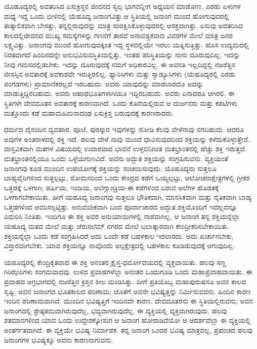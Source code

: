 ಯೊಹೂದ್ಯರಲ್ಲಿ ಅವತರಿಸಿದ ಏಸುಕ್ರಿಸ್ತನ ಜೀವನದ ಸ್ವಲ್ಪ ಭಾಗವನ್ನೀಗ ಅಧ್ಯಯನ ಮಾಡೋಣ. ಎರಡು ಏಳುಗಳ ಮಧ್ಯೆ ಇದ್ದ ಒಂದು ಬೀಳಿನಲ್ಲಿ ಯೆಹೂದ್ಯ ಜನಾಂಗವಿತ್ತು.\break ಆ ಸ್ಥಿತಿಯಲ್ಲಿ ಜನಾಂಗ ಮುಂದೆ ಹೋಗುವುದರಲ್ಲಿ ತಾತ್ಕಾಲಿಕವಾಗಿ ಬೇಸತ್ತು, ತನ್ನಲ್ಲಿರುವುದನ್ನು ಮಾತ್ರ ಸಂರಕ್ಷಿಸಿಕೊಳ್ಳುವುದರಲ್ಲಿ ಆಸಕ್ತವಾಗಿತ್ತು. ಏಸುವು ಅವತರಿಸಿದ ಕಾಲದಲ್ಲಿ\break ಜೀವನದ ಮುಖ್ಯ ಸಮಸ್ಯೆಗಳನ್ನು ಗಣನೆಗೆ ತಾರದೆ ಅನಾವಶ್ಯಕವಾದ ವಿವರಗಳ ಮೇಲೆ ಮಾತ್ರ ಜನರ ಲಕ್ಷ್ಯವಿತ್ತು. ಜನಾಂಗವು ಮುಂದೆ ಹೋಗುವುದಕ್ಕಿಂತ ಇದ್ದ ಸ್ಥಳದಲ್ಲಿಯೇ ಇರಲು ಯತ್ನಿಸುತ್ತಿತ್ತು. ಹೊಸ ಉದ್ಯಮದಲ್ಲಿ ನಿರತವಾಗದೆ ಹಿಂದಿನದನ್ನೇ ಅನುಭವಿಸುವ\break ಸ್ಥಿತಿಯಲ್ಲಿತ್ತು. ಇಂತಹ ಪರಿಸ್ಥಿತಿಯನ್ನು ನಾನು ದೂರುವುದಿಲ್ಲ. ಇದನ್ನು ನೀವು ಗಮನದಲ್ಲಿಡಬೇಕು. ಇದನ್ನು ದೂರುವುದಕ್ಕೆ ನಮಗೆ ಅಧಿಕಾರವಿಲ್ಲ. ಈ ಅವನತಿ ಇಲ್ಲದಿದ್ದಲ್ಲಿ ನಜರೆತ್ತಿನ ಜೀಸಸ್ಸಿನ ಅವತಾರಕ್ಕೆ ಅವಕಾಶವೇ ಇರುತ್ತಿರಲಿಲ್ಲ. ಫ್ಯಾರಿಸಿಗಳು ಮತ್ತು ಸ್ಯಾಡ್ಯೂಸಿಗಳು (ಯೆಹೂದ್ಯರಲ್ಲಿ ಎರಡು ಪಂಗಡಗಳು) ಪ್ರಾಮಾಣಿಕರಲ್ಲದೆ ಇರಬಹುದು. ಅವರು ಯಾವುದನ್ನು ಮಾಡಬಾರದೊ ಅದನ್ನು ಮಾಡುತ್ತಿದ್ದಿರಬಹುದು. ಅವರು ಆಷಾಢಭೂತಿಗಳಾಗಿಯೂ ಇದ್ದಿರಬಹುದು. ಅವರು ಏನಾದರೂ ಆಗಿರಲಿ, ಈ ಸ್ಥಿತಿಗಳೇ ದೇವದೂತನ ಅವತಾರಕ್ಕೆ ಕಾರಣವಾಗಿದೆ. ಒಂದು ಕೊನೆಯಲ್ಲಿರುವ ಆ ದುರ್ಜನರು ಮತ್ತು ಕಪಟಿಗಳು ಮತ್ತೊಂದು ಕಡೆ ಮಹಾಮಹಿಮನಾದಂಥ ಏಸುಕ್ರಿಸ್ತ ಬರುವುದಕ್ಕೆ ಕಾರಣರಾದರು.

ಧರ್ಮದ ದೈನಂದಿನ ವ್ಯವಹಾರ, ಪೂಜೆ, ಪುರಸ್ಕಾರ ಇವುಗಳನ್ನು ನೋಡಿ ಕೆಲವು ವೇಳೆ\break ನಾವು ನಗಬಹುದು. ಆದರೂ ಅವುಗಳ ಅಂತರಾಳದಲ್ಲಿ ಶಕ್ತಿ ಇದೆ. ಹಲವು ವೇಳೆ ನಾವು ಮುಂದೆ ಧಾವಿಸುವುದರಿಂದ ಶಕ್ತಿಯನ್ನು ಕಳೆದುಕೊಳ್ಳುತ್ತೇವೆ. ವಾಸ್ತವಿಕವಾಗಿ ಮತಗಳ ವಿಷಯದಲ್ಲಿ ಉದಾರವಾದ ಭಾವನೆ ಉಳ್ಳವನಿಗಿಂತ ಮತಭ್ರಾಂತನಲ್ಲಿ ಹೆಚ್ಚು ಶಕ್ತಿ ಇರುತ್ತದೆ. ಮತಭ್ರಾಂತನಲ್ಲಿಯೂ ಒಂದು ಒಳ್ಳೆಯಗುಣವಿದೆ. ಅವನು ಅದ್ಭುತ ಶಕ್ತಿಯನ್ನು ಸಂಗ್ರಹಿಸುವನು. ವ್ಯಕ್ತಿಯಂತೆ ಜನಾಂಗವು ಕೂಡ ಮುಂದಿನ ಉಪಯೋಗಕ್ಕೆ ಶಕ್ತಿಯನ್ನು ಸಂಚಯಿಸುವುದು. ಯೊಹೂದ್ಯರು ಸುತ್ತಲೂ ಬಾಹ್ಯವೈರಿಗಳಿಂದ ಸುತ್ತಲ್ಪಟ್ಟು, ರೋಮನರಿಂದ ಒಂದು ಕೇಂದ್ರದ ಕಡೆಗೆ ಒಯ್ಯಲ್ಪಟ್ಟು, ಆಲೋಚನಾಕ್ಷೇತ್ರಗಳಲ್ಲಿ ಗ್ರೀಕರ ಒತ್ತಡಕ್ಕೆ ಒಳಗಾಗಿ; ಪರ್ಷಿಯ, ಇಂಡಿಯ, ಅಲೆಗ್ಸಾಂಡ್ರಿಯ-ಈ ಕಡೆಗಳಿಂದ ಬರುವ ಅಲೆಗಳ ಹೊಡತಕ್ಕೆ ಒಳಗಾಗಬೇಕಾಯಿತು. ಹೀಗೆ ಯಹೂದ್ಯ ಜನಾಂಗವು ಸುತ್ತಲೂ ಭೌತಿಕವಾಗಿ, ಮಾನಸಿಕವಾಗಿ ಮತ್ತು ನೈತಿಕವಾಗಿ ಬಾಹ್ಯ ಒತ್ತಡಗಳಿಂದ ಆವರಿಸಲ್ಪಟ್ಟಿತ್ತು. ಅನುವಂಶಿಕವಾಗಿ ಬಂದ ಪೂರ್ವಾಚಾರದ ಅದ್ಭುತ ಶಕ್ತಿಯೊಂದಿಗೆ ಇದೆಲ್ಲವನ್ನೂ ಎದುರಿಸಿ ನಿಂತಿತು. ಇಂದಿಗೂ ಈ ಶಕ್ತಿ ಅವರ ಅನುಯಾಯಿಗಳಲ್ಲಿ ನಾಶವಾಗಿಲ್ಲ. ಆ ಜನಾಂಗ ತನ್ನ ಶಕ್ತಿಯನ್ನೆಲ್ಲಾ ಯಹೂದ್ಯ ಮತದ ಮೇಲೆ ಮತ್ತು ಜೆರುಸಲೆಮ್​ ನಗರದ ಮೇಲೆ ಬಲಾತ್ಕಾರವಾಗಿ ಕೇಂದ್ರೀಕರಿಸಬೇಕಾಯಿತು. ಶಕ್ತಿಯನ್ನೆಲ್ಲಾ ಒಂದು ಕಡೆ ಸಂಗ್ರಹಿಸಿದರೆ ಅದು ಒಂದೇ ಕಡೆ ಬಹಳಕಾಲ ಇರಲಾರದು. ಅದು ಖರ್ಚಾಗಬೇಕು, ವಿಸ್ತಾರವಾಗಬೇಕು. ಯಾವ ಶಕ್ತಿಯನ್ನೂ ನಾವೊಂದು ಅಲ್ಪಕ್ಷೇತ್ರದಲ್ಲಿ ಬಹಳಕಾಲ ಕೂಡಿಡುವುದಕ್ಕೆ ಆಗುವುದಿಲ್ಲ.

ಯಹೂದ್ಯರಲ್ಲಿ ಕೇಂದ್ರಿಕೃತವಾದ ಈ ಶಕ್ತಿ ಅನಂತರ ಕ್ರೈಸ್ತ-ಧರ್ಮೋದಯದಲ್ಲಿ ವ್ಯಕ್ತವಾಯಿತು. ಹಲವು ಸಣ್ಣ ಗಿರಿಝರಿಗಳು ಸಂಗಮವಾದವು. ಉಳಿದ ಪ್ರವಾಹಗಳೆಲ್ಲಾ ಅನಂತರ ಒಂದುಗೂಡಿ ಒಂದು ಮಹಾಪ್ರವಾಹವಾಯಿತು. ಈ ಪ್ರವಾಹದ ಅಗ್ರಭಾಗದಲ್ಲಿ ನಜರೆತ್ತಿನ ಕ್ರಿಸ್ತನ ಶೀಲ ಮಂಡಿಸಿತ್ತು. ಹೀಗೆ ಪ್ರತಿಯೊಬ್ಬ ಮಹಾಪುರುಷನೂ ಅವನ ಕಾಲದ ಸೃಷ್ಟಿ; ಅವನ ಜನಾಂಗದ ಭೂತಕಾಲದ ಪರಿಣಾಮ; ಜೊತೆಗೆ ಅವನೇ ಭವಿಷ್ಯತ್ತನ್ನು ನಿರ್ಮಿಸುವವನು. ಹಿಂದಿನ ಕಾರಣ ಇಂದಿನ ಪರಿಣಾಮವಾಗಿದೆ. ಮುಂದಿನ ಭವಿಷ್ಯತ್ತಿಗೆ ಇಂದಿನದೇ ಕಾರಣ. ದೇವದೂತರನು ಈ ಸ್ಥಿತಿಯಲ್ಲಿರುವನು; ಅವನ ಜನಾಂಗದಲ್ಲಿ ಶ್ರೇಷ್ಠತಮವಾಗಿರುವುದೆಲ್ಲ, ಭವ್ಯವಾಗಿರುವುದೆಲ್ಲ, ಈ ವ್ಯಕ್ತಿಯಲ್ಲಿ ವ್ಯಕ್ತವಾಗಿರುವುದು. ಹಲವು ಶತಮಾನಗಳಿಂದ ಯಾವ ಒಂದು ಉದ್ದೇಶಕ್ಕೋಸುಗ ಆ ಜನಾಂಗ ಹೋರಾಡಿದೆಯೋ ಆ ಆದರ್ಶವೆಲ್ಲಾ ಈ ವ್ಯಕ್ತಿಯಲ್ಲಿ ಅಂತರ್ಗತವಾಗಿದೆ. ಈ ವ್ಯಕ್ತಿಯೇ ಭವಿಷ್ಯ ನಿರ್ಮಾಪಕ. ತನ್ನ ಜನಾಂಗ ಒಂದರ ಭವಿಷ್ಯ ಮಾತ್ರವಲ್ಲ, ಪ್ರಪಂಚದ ಹಲವು ಜನಾಂಗಗಳ ಭವಿಷ್ಯಕ್ಕೂ ಅವನು ಕಾರಣನಾಗುವನು.

